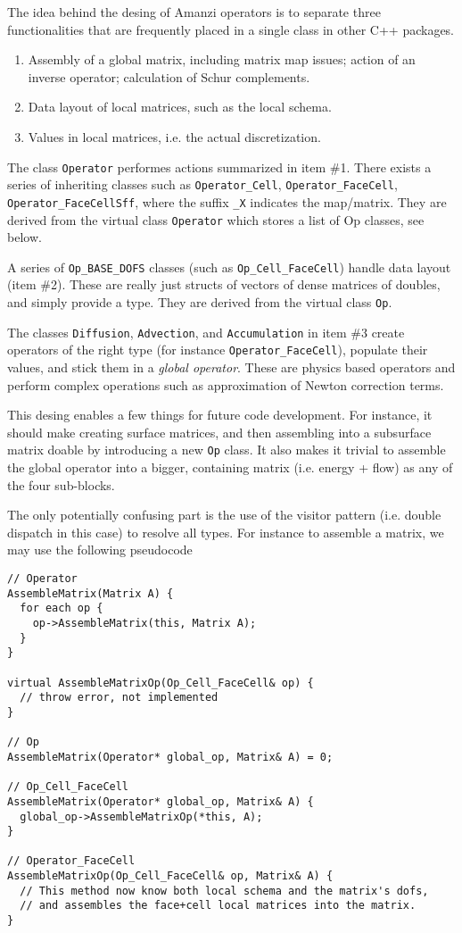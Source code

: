 The idea behind the desing of Amanzi operators is to separate three 
functionalities that are frequently placed in a single class in other
C++ packages.

\begin{enumerate}
\item Assembly of a global matrix, including matrix map issues;
action of an inverse operator; calculation of Schur complements.

\item Data layout of local matrices, such as the local schema.

\item Values in local matrices, i.e. the actual discretization.
\end{enumerate}

The class {\tt Operator} performes actions summarized in item \#1. There exists
a series of inheriting classes such as {\tt Operator\_Cell}, {\tt Operator\_FaceCell}, 
{\tt Operator\_FaceCellSff}, where the suffix {\tt \_X} indicates the map/matrix.
They are derived from the virtual class {\tt Operator} which stores a list of Op classes,
see below.

A series of {\tt Op\_BASE\_DOFS} classes (such as {\tt Op\_Cell\_FaceCell})
handle data layout (item \#2). These are really just structs of vectors of
dense matrices of doubles, and simply provide a type.
They are derived from the virtual class {\tt Op}.

The classes {\tt Diffusion}, {\tt Advection}, and {\tt Accumulation} 
in item \#3 create operators of the right type (for instance {\tt Operator\_FaceCell}), populate their 
values, and stick them in a {\it global operator}.
These are physics based operators and perform complex operations such as approximation
of Newton correction terms.

This desing enables a few things for future code development.
For instance, it should make creating surface matrices, and then assembling into a 
subsurface matrix doable by introducing a new {\tt Op} class.  
It also makes it trivial to assemble the global operator into a bigger, containing 
matrix (i.e. energy + flow) as any of the four sub-blocks.

The only potentially confusing part is the use of the visitor pattern (i.e. double dispatch 
in this case) to resolve all types.  
For instance to assemble a matrix, we may use the following pseudocode

\begin{verbatim}
// Operator
AssembleMatrix(Matrix A) {
  for each op {
    op->AssembleMatrix(this, Matrix A);
  }
}

virtual AssembleMatrixOp(Op_Cell_FaceCell& op) { 
  // throw error, not implemented
}

// Op
AssembleMatrix(Operator* global_op, Matrix& A) = 0;

// Op_Cell_FaceCell
AssembleMatrix(Operator* global_op, Matrix& A) {
  global_op->AssembleMatrixOp(*this, A);
}

// Operator_FaceCell
AssembleMatrixOp(Op_Cell_FaceCell& op, Matrix& A) {
  // This method now know both local schema and the matrix's dofs, 
  // and assembles the face+cell local matrices into the matrix.
}
\end{verbatim}

